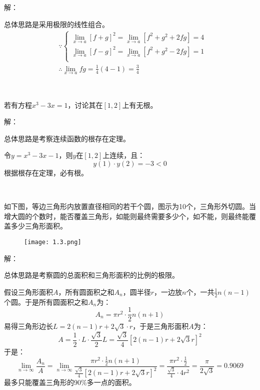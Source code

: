 解：

总体思路是采用极限的线性组合。
\begin{align*}
&\because \begin{cases}
	\underset{x\rightarrow a}{\lim}\left[ f+g \right] ^2=\underset{x\rightarrow a}{\lim}\left[ f^2+g^2+2fg \right] =4\\
	\underset{x\rightarrow a}{\lim}\left[ f-g \right] ^2=\underset{x\rightarrow a}{\lim}\left[ f^2+g^2-2fg \right] =1\\
\end{cases} \\
&\therefore \underset{x\rightarrow a}{\lim}fg=\frac{1}{4}\left( 4-1 \right) =\frac{3}{4}
\end{align*}

~

\begin{exercise}
若有方程$x^3-3x=1$，讨论其在$\left[ 1,2 \right] $上有无根。
\end{exercise}

解：

总体思路是考察连续函数的根存在定理。

令$y=x^3-3x-1$，则$y$在$\left[ 1,2 \right] $上连续，且：
\[
y\left( 1 \right) \cdot y\left( 2 \right) =-3<0
\]
根据根存在定理，必有根。

~

\begin{exercise}
如下图，等边三角形内放置直径相同的若干个圆，图示为10个，三角形外切圆。当增大圆的个数时，能否覆盖三角形，如能则最终需要多少个，如不能，则最终能覆盖多少三角形面积。
\begin{figure}[h]
\centering
\texttt{[image: 1.3.png]}
\end{figure}
\end{exercise}

解：

总体思路是考察圆的总面积和三角形面积的比例的极限。

假设三角形面积$A$，所有圆面积之和$A_n$，圆半径$r$，一边放$n$个，一共$\frac{1}{2}n\left( n-1 \right) $个圆。于是所有圆面积之和$A_n$为：
\[
A_n=\pi r^2\cdot \frac{1}{2}n\left( n+1 \right)
\]
易得三角形边长$L=2\left( n-1 \right) r+2\sqrt{3}\cdot r$，于是三角形面积$A$为：
\[
A=\frac{1}{2}\cdot L\cdot \frac{\sqrt{3}}{2}L=\frac{\sqrt{3}}{4}\left[ 2\left( n-1 \right) r+2\sqrt{3}r \right] ^2
\]
于是：
\[
\underset{n\rightarrow \infty}{\lim}\frac{A_n}{A}=\underset{n\rightarrow \infty}{\lim}\frac{\pi r^2\cdot \frac{1}{2}n\left( n+1 \right)}{\frac{\sqrt{3}}{4}\left[ 2\left( n-1 \right) r+2\sqrt{3}r \right] ^2}=\frac{\pi r^2\cdot \frac{1}{2}}{\frac{\sqrt{3}}{4}\cdot 4r^2}=\frac{\pi}{2\sqrt{3}}=0.9069
\]
最多只能覆盖三角形的90\%多一点的面积。




